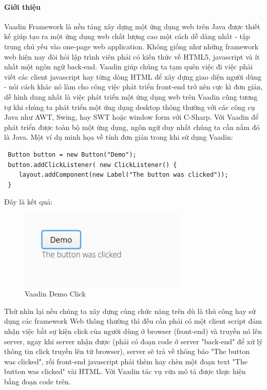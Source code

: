 \paragraph{Giới thiệu} Vaadin Framework là nền tảng xây dựng một ứng dụng web trên Java được thiết kế giúp tạo ra một ứng dụng web chất lượng cao một cách dễ dàng nhất - tập trung chủ yếu vào one-page web application. Không giống như những framework web hiện nay đòi hỏi lập trình viên phải có kiến thức về HTML5, javascript và ít nhất một ngôn ngữ back-end. Vaadin giúp chúng ta tạm quên việc đi việc phải viết các client javascript hay từng dòng HTML để xây dựng giao diện người dùng - nói cách khác nó làm cho công việc phát triển front-end trở nên cực kì đơn giản, dễ hình dung nhất là việc phát triển một ứng dụng web trên Vaadin cũng tương tự khi chúng ta phát triển một ứng dụng desktop thông thường với các công cụ Java như AWT, Swing, hay SWT hoặc window form với C-Sharp.  Với Vaadin để phát triển được toàn bộ một ứng dụng, ngôn ngữ duy nhất chúng ta cần nắm đó là Java. Một ví dụ minh họa về tính đơn giản trong khi sử dụng Vaadin:
\begin{verbatim}
 Button button = new Button("Demo");
 button.addClickListener( new ClickListener() {
    layout.addComponent(new Label("The button was clicked"));
 }
\end{verbatim}
Đây là kết quả:
\begin{figure}[H]
 	\centering
 	\includegraphics[width=80mm]{Figures/vaadin_democlick.png}
 	\caption{Vaadin Demo Click\label{overflow}}
\end{figure}
Thử nhìn lại nếu chúng ta xây dựng cùng chức năng trên dù là thủ công hay sử dụng các framework Web thông thường thì đều cần phải có một client script đảm nhận việc bắt sự kiện click của người dùng ở browser (front-end) và truyền nó lên server, ngay khi server nhận được (phải có đoạn code ở server "back-end" để xử lý thông tin click truyền lên từ browser), server sẽ trả về thông báo "The button was clicked", rồi front-end javascript phải thêm hay chèn một đoạn text "The button was clicked" vài HTML. Với Vaadin tác vụ vừa mô tả được thực hiện bằng đoạn code trên.
